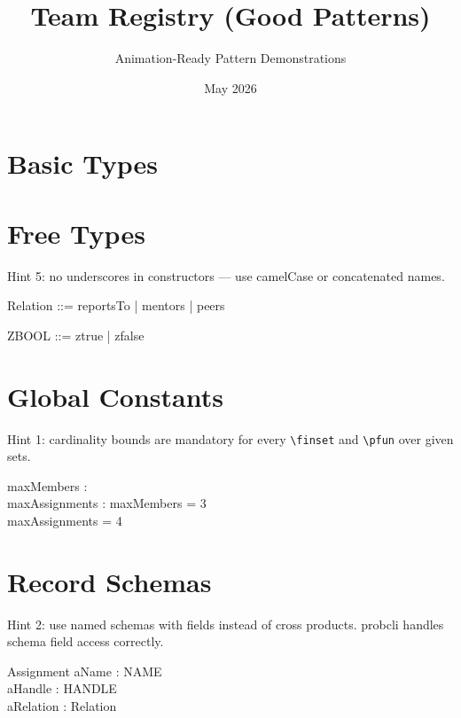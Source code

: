 \documentclass[a4paper,10pt,fleqn]{article}
\begin{document}
\title{Team Registry (Good Patterns)}
\author{Animation-Ready Pattern Demonstrations}
\date{May 2026}
\maketitle

\section{Basic Types}

\begin{zed}
\end{zed}

\section{Free Types}

Hint 5: no underscores in constructors --- use camelCase
or concatenated names.

\begin{zed}
  Relation ::= reportsTo | mentors | peers
\end{zed}

\begin{zed}
  ZBOOL ::= ztrue | zfalse
\end{zed}

\section{Global Constants}

Hint 1: cardinality bounds are mandatory for every
\verb|\finset| and \verb|\pfun| over given sets.

\begin{axdef}
  maxMembers : \nat \\
  maxAssignments : \nat
\where
  maxMembers = 3 \\
  maxAssignments = 4
\end{axdef}

\section{Record Schemas}

Hint 2: use named schemas with fields instead of cross
products. probcli handles schema field access correctly.

\begin{schema}{Assignment}
  aName : NAME \\
  aHandle : HANDLE \\
  aRelation : Relation
\end{schema}
\end{document}
